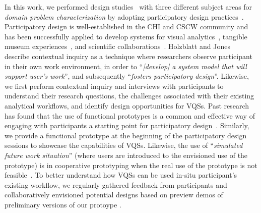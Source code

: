 {  \par In this work, we performed design studies~\cite{lam2012empirical,shneiderman2006strategies,Sedlmair2012} with three different subject areas for \textit{domain problem characterization} by adopting participatory design practices~\cite{Gould1983,Muller1993}. Participatory design is well-established in the CHI and CSCW community and has been successfully applied to develop systems for visual analytics~\cite{Aragon2008,Chuang2012}, tangible museum experiences~\cite{Ciolfi2016}, and scientific collaborations~\cite{Poon2008,Chen2016}.  Holzblatt and Jones~\cite{HoltzblattJones} describe contextual inquiry as a technique where researchers observe participant in their own work environment, in order to ``\textit{[develop] a system model that will support user's work}'', and subsequently ``\textit{fosters participatory design}''. Likewise, we first perform contextual inquiry and interviews with participants to understand their research questions, the challenges associated with their existing analytical workflows, and identify design opportunities for VQSs. Past research has found that the use of functional prototypes is a common and effective way of engaging with participants a starting point for participatory design~\cite{Ciolfi2016}. Similarly, we provide a functional prototype at the beginning of the participatory design sessions to showcase the capabilities of VQSs. Likewise, the use of ``\textit{simulated future work situation}'' (where users are introduced to the envisioned use of the prototype) is  in cooperative prototyping when the real use of the prototype is not feasible~\cite{Grnbak1991}. To better understand how VQSs can be used in-situ participant's existing workflow, we regularly gathered feedback from participants and collaboratively envisioned potential designs based on preview demos of preliminary versions of our protoype \zvpp. 
}
